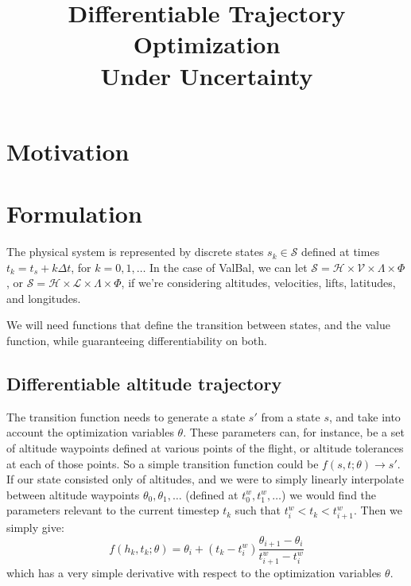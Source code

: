 \documentclass[11pt]{scrartcl} %
\title{\bfseries Differentiable Trajectory Optimization\\ Under Uncertainty}
\author{}
\date{}
\begin{document}
\maketitle

\def\States{\mathcal{S}}
\def\Altitudes{\mathcal{H}}
\def\Velocities{\mathcal{V}}
\def\Lifts{\mathcal{L}}


\section{Motivation}

\section{Formulation}
The physical system is represented by discrete states $s_k\in\States$ defined at times $t_k=t_s + k \Delta t$, for $k=0,1,\dots$ In the case of ValBal, we can let $\States=\Altitudes\times\Velocities\times\Lambda\times\Phi$, or $\States=\Altitudes\times\Lifts\times\Lambda\times\Phi$, if we're considering altitudes, velocities, lifts, latitudes, and longitudes.

We will need functions that define the transition between states, and the value function, while guaranteeing differentiability on both. 

\subsection{Differentiable altitude trajectory}
The transition function needs to generate a state $s'$ from a state $s$, and take into account the optimization variables $\theta$. These parameters can, for instance, be a set of altitude waypoints defined at various points of the flight, or altitude tolerances at each of those points. So a simple transition function could be $f(s, t; \theta) \to s'$. If our state consisted only of altitudes, and we were to simply linearly interpolate between altitude waypoints $\theta_0, \theta_1, \dots$ (defined at $t^w_0, t^w_1, \dots$) we would find the parameters relevant to the current timestep $t_k$ such that $t^w_i < t_k < t^w_{i+1}$. Then we simply give:
\[f(h_k, t_k; \theta) = \theta_i + (t_k - t_i^w) \frac{\theta_{i+1}-\theta_i}{t_{i+1}^w - t^w_i}\]
which has a very simple derivative with respect to the optimization variables $\theta$.
\end{document}

